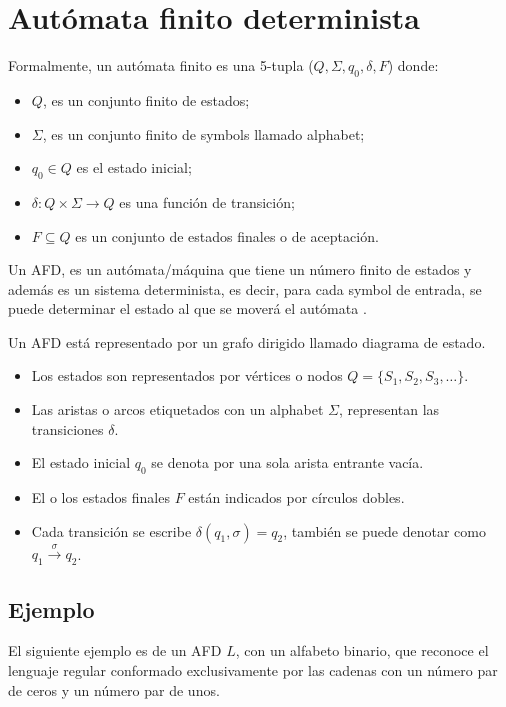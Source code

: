 \section{Autómata finito determinista}\label{FiniteAutomaton}
Formalmente, un autómata finito es una 5-tupla ($Q, \Sigma, q_{0}, \delta, F$) donde:

\begin{itemize}
	\item $Q$, es un conjunto finito de estados;
	\item $\Sigma$, es un conjunto finito de \glspl{symbol} llamado \gls{alphabet};
	\item $q_{0}\in Q$ es el estado inicial;
	\item $\delta \colon Q\times \Sigma \to Q$ es una función de transición;
	\item $F\subseteq Q$ es un conjunto de estados finales o de aceptación.
\end{itemize}

Un \acrfull{AFD}, es un autómata/máquina que tiene un número finito de estados y además es un sistema determinista, es decir, para cada \gls{symbol} de entrada, se puede determinar el estado al que se moverá el autómata \cite{wiki:Automata_finito}. 

Un \acrshort{AFD} está representado por un grafo dirigido llamado diagrama de estado.

\begin{itemize}
	\item Los estados son representados por vértices o nodos $Q = \{ S_1, S_2, S_3, \dots \}$.
	\item Las aristas o arcos etiquetados con un \gls{alphabet} $\Sigma$, representan las transiciones $\delta$.
	\item El estado inicial $q_{0}$ se denota por una sola arista entrante vacía.
	\item El o los estados finales $F$ están indicados por círculos dobles.
	\item Cada transición se escribe  $\delta ( q_1, \sigma ) = q_2$,  también se puede denotar como $q_1 \xrightarrow{\sigma} q_2$.
\end{itemize}

\subsection{Ejemplo}
El siguiente ejemplo es de un \acrshort{AFD} $L$, con un alfabeto binario, que reconoce el lenguaje regular conformado exclusivamente por las cadenas con un número par de ceros y un número par de unos.

